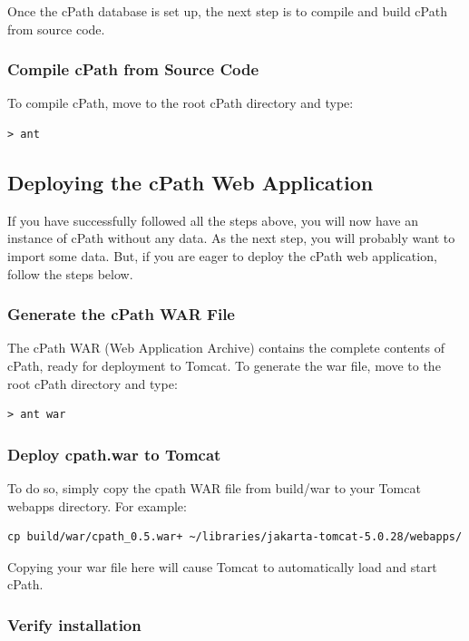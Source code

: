 \documentclass[letterpaper,12pt]{article}
\begin{document}
Once the cPath database is set up, the next step is to compile and build cPath from source code.

\subsubsection{Compile cPath from Source Code}

To compile cPath, move to the root cPath directory and type:

\begin{verbatim}
> ant
\end{verbatim}

\subsection{Deploying the cPath Web Application}

If you have successfully followed all the steps above, you will now have an instance of cPath without any data.  As the next step, you will probably want to import some data.  But, if you are eager to deploy the cPath web application, follow the steps below.

\subsubsection{Generate the cPath WAR File}  
\label{generate-war}

The cPath WAR (Web Application Archive) contains the complete contents of cPath, ready for deployment to Tomcat. To generate the war file, move to the root cPath directory and type:

\begin{verbatim}
> ant war
\end{verbatim}

\subsubsection{Deploy cpath.war to Tomcat}

To do so, simply copy the cpath WAR file from build/war to your Tomcat webapps directory. For example:
\begin{verbatim}
cp build/war/cpath_0.5.war+ ~/libraries/jakarta-tomcat-5.0.28/webapps/
\end{verbatim}

Copying your war file here will cause Tomcat to automatically load and start cPath.

\subsubsection{Verify installation}
\end{document}
